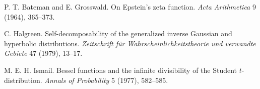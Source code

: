  P. T. Bateman and E. Grosswald. On Epstein's zeta function. \emph{Acta Arithmetica} 9 (1964), 365--373.

 C. Halgreen. Self-decomposability of the generalized inverse Gaussian and hyperbolic distributions. \emph{Zeitschrift f\"ur Wahrscheinlichkeitstheorie und verwandte Gebiete} 47 (1979), 13--17.

 M. E. H. Ismail. Bessel functions and the infinite divisibility of the Student $t$-distribution. \emph{Annals of Probability} 5 (1977), 582--585.
